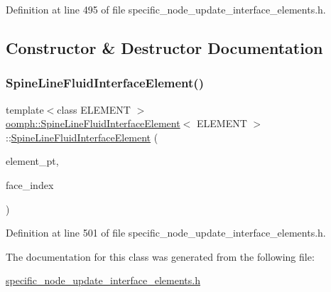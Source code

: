 Definition at line 495 of file specific\+\_\+node\+\_\+update\+\_\+interface\+\_\+elements.\+h.



\subsection{Constructor \& Destructor Documentation}
\mbox{\label{classoomph_1_1SpineLineFluidInterfaceElement_aaafc180606b418920b0588532f8bfbec}} 
\subsubsection{\texorpdfstring{Spine\+Line\+Fluid\+Interface\+Element()}{SpineLineFluidInterfaceElement()}}
{\footnotesize\ttfamily template$<$class E\+L\+E\+M\+E\+NT $>$ \\
\hyperlink{classoomph_1_1SpineLineFluidInterfaceElement}{oomph\+::\+Spine\+Line\+Fluid\+Interface\+Element}$<$ E\+L\+E\+M\+E\+NT $>$\+::\hyperlink{classoomph_1_1SpineLineFluidInterfaceElement}{Spine\+Line\+Fluid\+Interface\+Element} (\begin{DoxyParamCaption}\item[{Finite\+Element $\ast$const \&}]{element\+\_\+pt,  }\item[{const int \&}]{face\+\_\+index }\end{DoxyParamCaption})\hspace{0.3cm}{\ttfamily [inline]}}



Definition at line 501 of file specific\+\_\+node\+\_\+update\+\_\+interface\+\_\+elements.\+h.



The documentation for this class was generated from the following file\+:\begin{DoxyCompactItemize}
\item 
\hyperlink{specific__node__update__interface__elements_8h}{specific\+\_\+node\+\_\+update\+\_\+interface\+\_\+elements.\+h}\end{DoxyCompactItemize}
